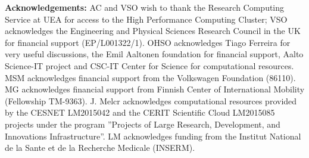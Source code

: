 \documentclass[twoside,twocolumn,9pt]{article}
\begin{document}
{\bf Acknowledgements: }
AC and VSO wish to thank the Research Computing Service at UEA for access to the High Performance Computing Cluster; VSO acknowledges the Engineering and Physical Sciences Research Council in the UK for financial support (EP/L001322/1).
%
OHSO acknowledges Tiago Ferreira for very useful discussions, the Emil Aaltonen foundation for financial support, Aalto Science-IT project and CSC-IT Center for Science for computational resources. 
%
MSM acknowledges financial support from the Volkswagen Foundation (86110).
%
MG acknowledges financial support from Finnish Center of International Mobility (Fellowship TM-9363).
%
J. Melcr acknowledges computational resources provided by the CESNET LM2015042 and the CERIT Scientific Cloud LM2015085 projects under the program ''Projects of Large Research, Development, and Innovations Infrastructure''.
%
LM acknowledges funding from the Institut National de la Sante et de la Recherche Medicale (INSERM).

\end{document}
